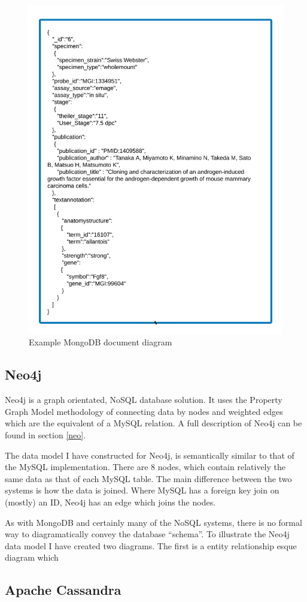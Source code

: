 \newpage
\begin{figure}[H]\begin{center}\includegraphics[width=1\linewidth]{images/mongo_modeldesign}\caption{Example MongoDB document diagram}\label{fig:mongo}\end{center}\end{figure}

\newpage
\subsection*{Neo4j}
Neo4j is a graph orientated, NoSQL database solution. It uses the Property Graph Model methodology of connecting data by nodes and weighted edges which are the equivalent of a MySQL relation. A full description of Neo4j can be found in section \ref{neo}.

The data model I have constructed for Neo4j, is semantically similar to that of the MySQL implementation. There are 8 nodes, which contain relatively the same data as that of each MySQL table. The main difference between the two systems is how the data is joined. Where MySQL has a foreign key join on (mostly) an ID, Neo4j has an edge which joins the nodes.

As with MongoDB and certainly many of the NoSQL systems, there is no formal way to diagramatically convey the database ``schema''. To illustrate the Neo4j data model I have created two diagrams. The first is a entity relationship esque diagram which 

\subsection*{Apache Cassandra}






